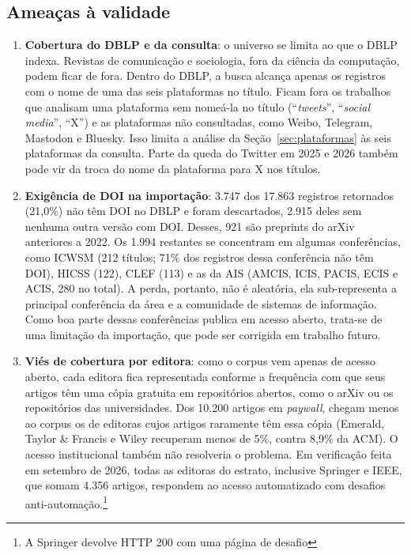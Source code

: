 \documentclass[11pt,a4paper]{article}
\begin{document}
\subsection{Ameaças à validade}
\label{sec:limitacoes}
\begin{enumerate}[leftmargin=1.4em]
  \item \textbf{Cobertura do DBLP e da consulta}: o universo se limita ao que o DBLP indexa. Revistas de comunicação e sociologia, fora da ciência da
  computação, podem ficar de fora. Dentro do DBLP, a busca alcança apenas os
  registros com o nome de uma das seis plataformas no título. Ficam fora os
  trabalhos que analisam uma plataforma sem nomeá-la no título (``\textit{tweets}'',
  ``\textit{social media}'', ``X'') e as plataformas não consultadas, como
  Weibo, Telegram, Mastodon e Bluesky. Isso limita a análise da
  Seção~\ref{sec:plataformas} às seis plataformas da consulta. Parte da queda do Twitter em 2025 e 2026 também pode vir da troca do nome da plataforma para X nos
  títulos.
  \item \textbf{Exigência de DOI na importação}: 3.747 dos 17.863 registros
  retornados (21,0\%) não têm DOI no DBLP e foram descartados, 2.915 deles sem
  nenhuma outra versão com DOI. Desses, 921 são preprints do arXiv anteriores a 2022. Os 1.994 restantes se concentram em algumas conferências, como ICWSM (212
  títulos; 71\% dos registros dessa conferência não têm DOI), HICSS (122), CLEF
  (113) e as da AIS (AMCIS, ICIS, PACIS, ECIS e ACIS, 280 no total). A perda,
  portanto, não é aleatória, ela sub-representa a principal conferência da área
  e a comunidade de sistemas de informação. Como boa parte dessas conferências
  publica em acesso aberto, trata-se de uma limitação da importação, que pode
  ser corrigida em trabalho futuro.
  \item \textbf{Viés de cobertura por editora}: como o corpus vem apenas de acesso aberto, cada editora fica representada
  conforme a frequência com que seus artigos têm uma cópia gratuita em
  repositórios abertos, como o arXiv ou os repositórios das universidades. Dos
  10.200 artigos em \textit{paywall}, chegam menos ao corpus os de editoras cujos
  artigos raramente têm essa cópia (Emerald, Taylor \& Francis e
  Wiley recuperam menos de 5\%, contra 8,9\% da ACM). O acesso institucional
  também não resolveria o problema. Em verificação feita em setembro de 2026,
  todas as editoras do estrato, inclusive Springer e IEEE, que somam 4.356
  artigos, respondem ao acesso automatizado com desafios
  anti-automação.\footnote{A Springer devolve HTTP 200 com uma página de desafio
}
\end{enumerate}
\end{document}
